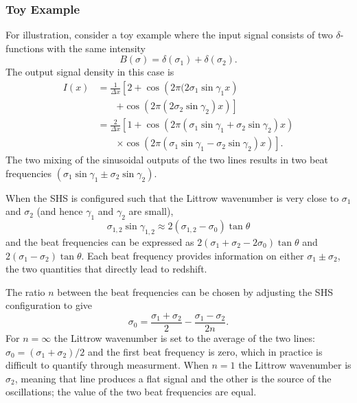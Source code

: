 \documentclass[preprint2, 10pt]{aastex}
\begin{document}
\subsubsection{Toy Example}
\label{toy:sec}
For illustration, consider a toy example where the input signal consists of two $\delta$-functions with the same intensity
\begin{equation}
B(\sigma)=\delta(\sigma_1)+\delta(\sigma_2).
\end{equation}
The output signal density in this case is
\begin{align}
I(x)&=\frac{1}{\Delta x}\left[2+ \cos{\left(2 \pi (2\sigma_1  \sin{\gamma_1}x \right)} \right. \nonumber \\
& \qquad \left.+ \cos{\left(2\pi (2  \sigma_2  \sin{\gamma_2})x \right)}\right]\\
&=\frac{2}{\Delta x}\left[1+ \cos{\left(2 \pi  (\sigma_1  \sin{\gamma_1}+ \sigma_2  \sin{\gamma_2})x \right)}  \right. \nonumber \\
& \qquad \left. \times\cos{\left(2\pi  (\sigma_1  \sin{\gamma_1}- \sigma_2  \sin{\gamma_2})x\right)}\right].
\end{align}
The two mixing of the sinusoidal outputs of the two lines results in two beat frequencies $(\sigma_1  \sin{\gamma_1}\pm\sigma_2  \sin{\gamma_2})$.

When the SHS is configured such that the Littrow wavenumber is
very close to $\sigma_1$ and $\sigma_2$ (and hence $\gamma_1$ and $\gamma_2$
are small),
\begin{equation}
\sigma_{1,2}\sin{\gamma_{1,2}} \approx  2(\sigma_{1,2}-\sigma_0) \tan{\theta}
\end{equation}
and the beat frequencies can be expressed as
$2(\sigma_1+\sigma_2-2\sigma_0)\tan{\theta}$ and $2(\sigma_1-\sigma_2)\tan{\theta}$.
Each beat frequency provides information on either 
$\sigma_1\pm \sigma_2$, the two quantities that directly lead to redshift.

The ratio $n$ between the beat frequencies can be chosen by adjusting the SHS configuration to give
\begin{equation}
\sigma_0=\frac{\sigma_1+\sigma_2}{2}-\frac{\sigma_1-\sigma_2}{2n}.
\label{littrowchoices:eqn}
\end{equation}
For $n=\infty$  the Littrow wavenumber is set to the average of the two lines: $\sigma_0=(\sigma_1+\sigma_2)/2$ and the first beat frequency is zero,
which in practice is difficult to quantify through measurment.  When $n=1$ the Littrow wavenumber is $\sigma_2$, meaning that line produces a flat signal and the other is the source
of the oscillations; the value of the two beat frequencies are equal.
\end{document}
